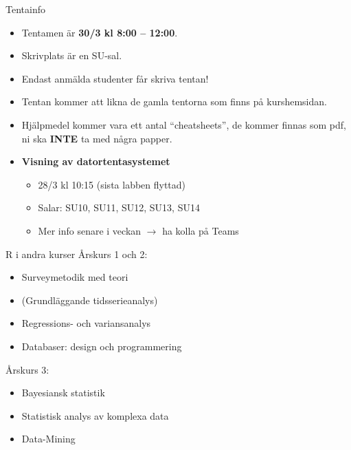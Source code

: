 \documentclass[
  11pt,
  ignorenonframetext,
  handout]{beamer}
\providecommand{\tightlist}{%
  \setlength{\itemsep}{0pt}\setlength{\parskip}{0pt}}
\begin{document}

\begin{frame}{Tentainfo}
\protect\hypertarget{tentainfo}{}
\begin{itemize}
\tightlist
\item
  Tentamen är \textbf{30/3 kl 8:00 -- 12:00}.
\item
  Skrivplats är en SU-sal.
\item
  Endast anmälda studenter får skriva tentan!
\item
  Tentan kommer att likna de gamla tentorna som finns på kurshemsidan.
\item
  Hjälpmedel kommer vara ett antal ``cheatsheets'', de kommer finnas som
  pdf, ni ska \textbf{INTE} ta med några papper.
\item
  \textbf{Visning av datortentasystemet} 
  \begin{itemize}
  \tightlist
  \item
    28/3 kl 10:15 (sista labben flyttad)
  \item
    Salar: SU10, SU11, SU12, SU13, SU14  
  \item
    Mer info senare i veckan $\rightarrow$ ha kolla på Teams
  \end{itemize}
\end{itemize}
\end{frame}


\begin{frame}{R i andra kurser}
\protect\hypertarget{r-i-andra-kurser}{}
Årskurs 1 och 2:

\begin{itemize}
\tightlist
\item
  Surveymetodik med teori
\item
  (Grundläggande tidsserieanalys)
\item
  Regressions- och variansanalys
\item
  Databaser: design och programmering
\end{itemize}

Årskurs 3:

\begin{itemize}
\tightlist
\item
  Bayesiansk statistik
\item
  Statistisk analys av komplexa data
\item
  Data-Mining
\end{itemize}
\end{frame}
\end{document}
